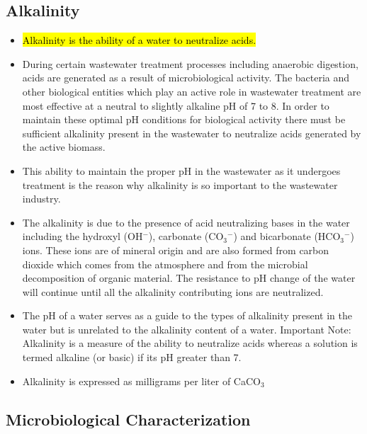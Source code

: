 			
\subsection{Alkalinity}	
			\begin{itemize}
				\item \hl{Alkalinity is the ability of a water to neutralize acids.}  
				\item During certain wastewater treatment processes including anaerobic digestion, acids are generated as a result of microbiological activity.  The bacteria and other biological entities which play an active role in wastewater treatment are most effective at a neutral to slightly alkaline pH of 7 to 8.  In order to maintain these optimal pH conditions for biological activity there must be sufficient alkalinity present in the wastewater to neutralize acids generated by the active biomass.
				\item This ability to maintain the proper pH in the wastewater as it undergoes treatment is the reason why alkalinity is so important to the wastewater industry.
				\item The alkalinity is due to the presence of acid neutralizing bases in the water including the hydroxyl (OH$^-$), carbonate (CO$_3$$^-$) and bicarbonate (HCO$_3$$^-$)  ions.  These ions are of mineral origin and are also formed from carbon dioxide which comes from the atmosphere and from the microbial decomposition of organic material.  The resistance to pH change of the water will continue until all the alkalinity contributing ions are neutralized.  
				\item The pH of a water serves as a guide to the types of alkalinity present in the water but is unrelated to the alkalinity content of a water.  Important Note:  Alkalinity is a measure of the ability to neutralize acids whereas a solution is termed alkaline (or basic) if its pH greater than 7. 
				\item Alkalinity is expressed as milligrams per liter of CaCO$_3$
			\end{itemize}
			
	
\subsection{Microbiological Characterization}	
			
